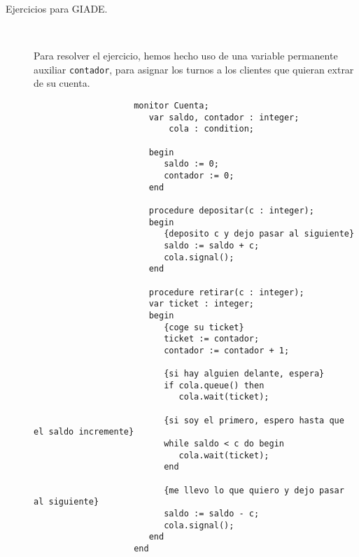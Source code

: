 \documentclass[12pt]{article}
\begin{document}
    \begin{description}
        \item [Ejercicios para GIADE.]~\\
            \begin{ejercicio}\label{ej:5}
                Para resolver el ejercicio, hemos hecho uso de una variable permanente auxiliar \verb|contador|, para asignar los turnos a los clientes que quieran extrar de su cuenta.
                \begin{verbatim}
                    monitor Cuenta;
                       var saldo, contador : integer;
                           cola : condition;

                       begin
                          saldo := 0;
                          contador := 0;
                       end

                       procedure depositar(c : integer);
                       begin
                          {deposito c y dejo pasar al siguiente}
                          saldo := saldo + c;
                          cola.signal();
                       end

                       procedure retirar(c : integer);
                       var ticket : integer;
                       begin
                          {coge su ticket}
                          ticket := contador;
                          contador := contador + 1;

                          {si hay alguien delante, espera}
                          if cola.queue() then
                             cola.wait(ticket);

                          {si soy el primero, espero hasta que el saldo incremente}
                          while saldo < c do begin
                             cola.wait(ticket);
                          end

                          {me llevo lo que quiero y dejo pasar al siguiente}
                          saldo := saldo - c;
                          cola.signal();
                       end
                    end
                \end{verbatim}
            \end{ejercicio}


\end{description}
\end{document}
